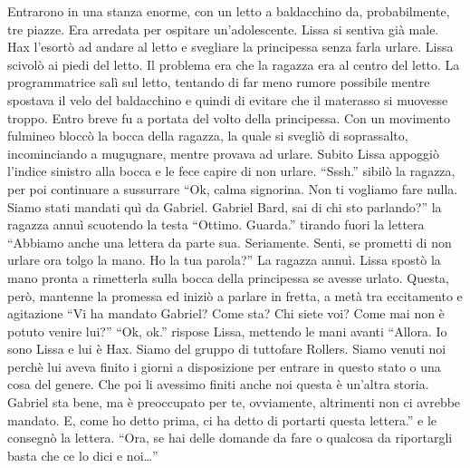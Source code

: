     Entrarono in una stanza enorme, con un letto a baldacchino da,
    probabilmente, tre piazze. Era arredata per ospitare un'adolescente.
    Lissa si sentiva già male. Hax l'esortò ad andare al letto e svegliare
    la principessa senza farla urlare. Lissa scivolò ai piedi del letto. Il
    problema era che la ragazza era al centro del letto. La programmatrice
    salì sul letto, tentando di far meno rumore possibile mentre spostava
    il velo del baldacchino e quindi di evitare che il materasso si
    muovesse troppo. Entro breve fu a portata del volto della principessa.
    Con un movimento fulmineo bloccò la bocca della ragazza, la quale si
    svegliò di soprassalto, incominciando a mugugnare, mentre provava ad
    urlare. Subito Lissa appoggiò l'indice sinistro alla
    bocca e le fece capire di non urlare. ``Sssh.'' sibilò la ragazza, per
    poi continuare a sussurrare ``Ok, calma signorina. Non ti vogliamo fare
    nulla. Siamo stati mandati quì da Gabriel. Gabriel Bard, sai di chi sto
    parlando?'' la ragazza annuì scuotendo la testa ``Ottimo. Guarda.''
    tirando fuori la lettera ``Abbiamo anche una lettera da parte sua.
    Seriamente. Senti, se prometti di non urlare ora tolgo la mano. Ho la
    tua parola?'' La ragazza annuì. Lissa spostò la mano pronta a
    rimetterla sulla bocca della principessa se avesse urlato. Questa,
    però, mantenne la promessa ed iniziò a parlare in fretta, a metà tra
    eccitamento e agitazione ``Vi ha mandato Gabriel? Come sta? Chi siete
    voi? Come mai non è potuto venire lui?'' ``Ok, ok.'' rispose Lissa,
    mettendo le mani avanti ``Allora. Io sono Lissa e lui è Hax. Siamo del
    gruppo di tuttofare Rollers. Siamo venuti noi perchè lui aveva finito i
    giorni a disposizione per entrare in questo stato o una cosa del
    genere. Che poi li avessimo finiti anche noi questa è un'altra storia.
    Gabriel sta bene, ma è preoccupato per te, ovviamente, altrimenti non
    ci avrebbe mandato. E, come ho detto prima, ci ha detto di portarti
    questa lettera.'' e le consegnò la lettera. ``Ora, se hai delle domande
    da fare o qualcosa da riportargli basta che ce lo dici e noi\dots{}''
    
